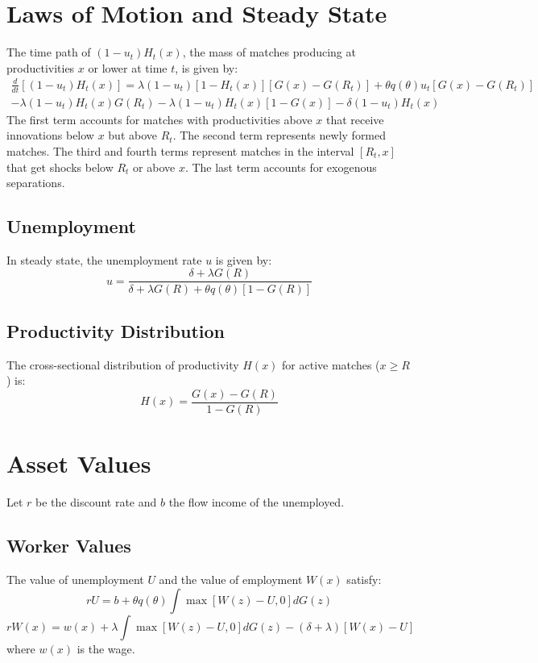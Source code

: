 \documentclass[11pt]{article}
\begin{document}
\section{Laws of Motion and Steady State}
The time path of $(1 - u_t)H_t(x)$, the mass of matches producing at productivities $x$ or lower at time $t$, is given by:
\begin{multline}
\frac{d}{dt} [(1 - u_t)H_t(x)] = \lambda(1 - u_t)[1 - H_t(x)][G(x) - G(R_t)] + \theta q(\theta)u_t[G(x) - G(R_t)] \\
- \lambda(1 - u_t)H_t(x)G(R_t) - \lambda(1 - u_t)H_t(x)[1 - G(x)] - \delta(1 - u_t)H_t(x)
\end{multline}
The first term accounts for matches with productivities above $x$ that receive innovations below $x$ but above $R_t$. The second term represents newly formed matches. The third and fourth terms represent matches in the interval $[R_t, x]$ that get shocks below $R_t$ or above $x$. The last term accounts for exogenous separations.

\subsection{Unemployment}
In steady state, the unemployment rate $u$ is given by:
\begin{equation}
u = \frac{\delta + \lambda G(R)}{\delta + \lambda G(R) + \theta q(\theta)[1 - G(R)]}
\end{equation}

\subsection{Productivity Distribution}
The cross-sectional distribution of productivity $H(x)$ for active matches ($x \ge R$) is:
\begin{equation}
H(x) = \frac{G(x) - G(R)}{1 - G(R)}
\end{equation}

\section{Asset Values}
Let $r$ be the discount rate and $b$ the flow income of the unemployed.

\subsection{Worker Values}
The value of unemployment $U$ and the value of employment $W(x)$ satisfy:
\begin{equation}
rU = b + \theta q(\theta) \int \max[W(z) - U, 0] dG(z)
\end{equation}
\begin{equation}
rW(x) = w(x) + \lambda \int \max[W(z) - U, 0] dG(z) - (\delta + \lambda)[W(x) - U]
\end{equation}
where $w(x)$ is the wage.
\end{document}
